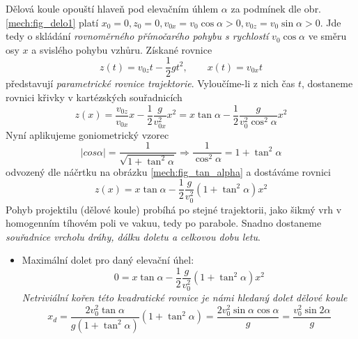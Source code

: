 \begin{example}
          Dělová koule opouští hlaveň pod elevačním úhlem $\alpha$ za podmínek dle obr.
          \ref{mech:fig_delo1} platí  $x_0=0, z_0=0, v_{0x}=v_0\cos\alpha>0,
          v_{0z}=v_0\sin\alpha>0$. Jde tedy o skládání \emph{rovnoměrného přímočarého pohybu s
          rychlostí} $v_0\cos\alpha$ ve směru osy $x$ a svislého pohybu vzhůru. Získané rovnice
          \begin{equation}\label{mech:eq_delo_rce_pohybu}
            z(t)=v_{0z}t-\frac{1}{2}gt^2, \qquad x(t)=v_{0x}t
          \end{equation}
          představují \emph{parametrické rovnice trajektorie}. Vyloučíme-li z nich čas $t$,
          dostaneme rovnici křivky v kartézských souřadnicích
          \begin{equation}\label{mech:eq_delo_vakuum_param_rce}
            z(x)=  \frac{v_{0z}}{v_{0x}}x-\frac{1}{2}\frac{g}{v_{0x}^2}x^2
                = x\tan\alpha-\frac{1}{2}\frac{g}{v_0^2\cos^2\alpha}x^2
          \end{equation}
          Nyní aplikujeme goniometrický vzorec
          \begin{equation*}
            |cos\alpha|=   \frac{1}{\sqrt{1+\tan^2\alpha}}\Rightarrow \frac{1}{\cos^2\alpha} 
                       = 1+\tan^2\alpha
          \end{equation*}
          odvozený dle náčrtku na obrázku \ref{mech:fig_tan_alpha} a dostáváme rovnici
          \begin{equation}\label{mech_eq_example_vysledna_rce}
            z(x)=x\tan\alpha-\frac{1}{2}\frac{g}{v_0^2}(1+\tan^2\alpha)x^2
          \end{equation}
          Pohyb projektilu (dělové koule) probíhá po stejné trajektorii, jako šikmý vrh v
          homogenním tíhovém poli ve vakuu, tedy po parabole. Snadno dostaneme \emph{souřadnice
          vrcholu dráhy, dálku doletu a celkovou dobu letu}.

          \begin{itemize}
            \item Maximální dolet pro daný elevační úhel:
              \begin{equation}\label{mech:eq_elevacni_uhel_1}
                0=x\tan\alpha-\frac{1}{2}\frac{g}{v_0^2}(1+\tan^2\alpha)x^2
              \end{equation}
              \emph{Netriviální kořen této kvadratické rovnice je námi hledaný dolet dělové koule}
              \begin{equation}\label{mech:eq_elevacni_uhel_2}
                x_d=\frac{2v_0^2\tan\alpha}{g(1+\tan^2\alpha)}(1+\tan^2\alpha)
                   =\frac{2v_0^2\sin\alpha\cos\alpha}{g}=\frac{v_0^2\sin{2\alpha}}{g}
              \end{equation}


\end{itemize}
\end{example}
